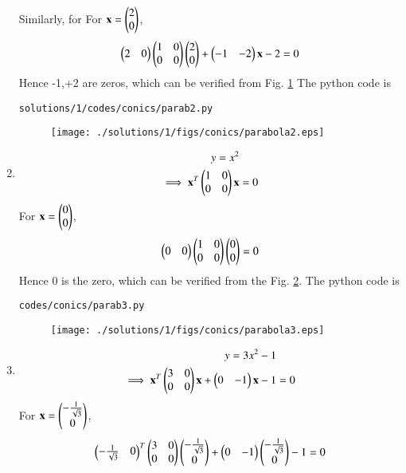 \begin{enumerate}
\begin{align}
\end{align}
Similarly, for 
For $\mathbf{x} = \begin{pmatrix}2\\0\end{pmatrix}$,
\begin{align}
\begin{pmatrix}2 & 0\end{pmatrix} \begin{pmatrix}1 & 0\\0 & 0\end{pmatrix}\begin{pmatrix}2\\0\end{pmatrix}+\begin{pmatrix}-1 & -2\end{pmatrix}\mathbf{x}-2=0
\end{align}
Hence -1,+2 are zeros, which can be verified from Fig.  \ref{fig:5.2.1_parab2}
The python code  is
\begin{lstlisting}
solutions/1/codes/conics/parab2.py
\end{lstlisting}
\begin{figure}[!ht]
\texttt{[image: ./solutions/1/figs/conics/parabola2.eps]}
\caption{}
\label{fig:5.2.1_parab2}
\end{figure}
\item 
\begin{align}
y = x^2 &
\\
\implies \mathbf{x}^T \begin{pmatrix}1 & 0\\0 & 0\end{pmatrix}\mathbf{x}&=0
\end{align}
For $\mathbf{x} = \begin{pmatrix}0\\0\end{pmatrix}$,
\begin{align}
\begin{pmatrix}0 & 0\end{pmatrix} \begin{pmatrix}1 & 0\\0 & 0\end{pmatrix}\begin{pmatrix}0\\0\end{pmatrix}=0
\end{align}
Hence 0 is the  zero, which can be verified from the Fig.  \ref{fig:5.2.1_parab3}.
The python code is
\begin{lstlisting}
codes/conics/parab3.py
\end{lstlisting}
\begin{figure}[!ht]
\texttt{[image: ./solutions/1/figs/conics/parabola3.eps]}
\caption{}
\label{fig:5.2.1_parab3}
\end{figure}
\item 
\begin{align}
y = 3x^2-1 &
\\
\implies \mathbf{x}^T \begin{pmatrix}3 & 0\\0 & 0\end{pmatrix}\mathbf{x}+\begin{pmatrix}0 & -1\end{pmatrix}\mathbf{x}-1&=0
\end{align}
For $\mathbf{x} = \begin{pmatrix}-\frac{1}{\sqrt{3}}\\0\end{pmatrix}$,
\begin{align}
\myvec{-\frac{1}{\sqrt{3}} & 0}^T \myvec{3 & 0\\0 & 0}\myvec{-\frac{1}{\sqrt{3}}\\0}+\myvec{0 & -1}\myvec{-\frac{1}{\sqrt{3}}\\0}-1=0

\end{align}
\end{enumerate}

